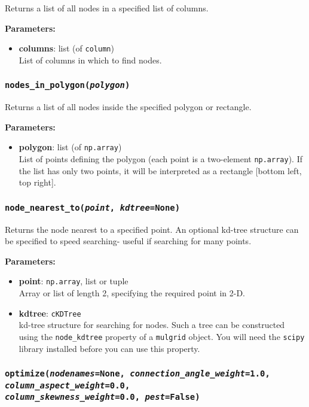 Returns a list of all nodes in a specified list of columns.

\textbf{Parameters:}
\begin{itemize}
\item \textbf{columns}: list (of \texttt{column})\\
  List of columns in which to find nodes.
\end{itemize}

\subsubsection{\texttt{nodes\_in\_polygon(\emph{polygon})}}

Returns a list of all nodes inside the specified polygon or rectangle.

\textbf{Parameters:}
\begin{itemize}
\item \textbf{polygon}: list (of \texttt{np.array})\\
  List of points defining the polygon (each point is a two-element \texttt{np.array}).  If the list has only two points, it will be interpreted as a rectangle [bottom left, top right].
\end{itemize}

\subsubsection{\texttt{node\_nearest\_to(\emph{point}, \emph{kdtree}=None)}}

Returns the node nearest to a specified point.  An optional kd-tree structure can be specified to speed searching- useful if searching for many points.

\textbf{Parameters:}
\begin{itemize}
\item \textbf{point}:  \texttt{np.array}, list or tuple\\
  Array or list of length 2, specifying the required point in 2-D.
\item \textbf{kdtree}:  \texttt{cKDTree}\\
  kd-tree structure for searching for nodes.  Such a tree can be constructed using the \texttt{node\_kdtree} property of a \texttt{mulgrid} object.  You will need the \texttt{scipy} library installed before you can use this property.
\end{itemize}

\subsubsection{\texttt{optimize(\emph{nodenames}=None, \emph{connection\_angle\_weight}=1.0, \emph{column\_aspect\_weight}=0.0,\\
    \emph{column\_skewness\_weight}=0.0, \emph{pest}=False)}}

